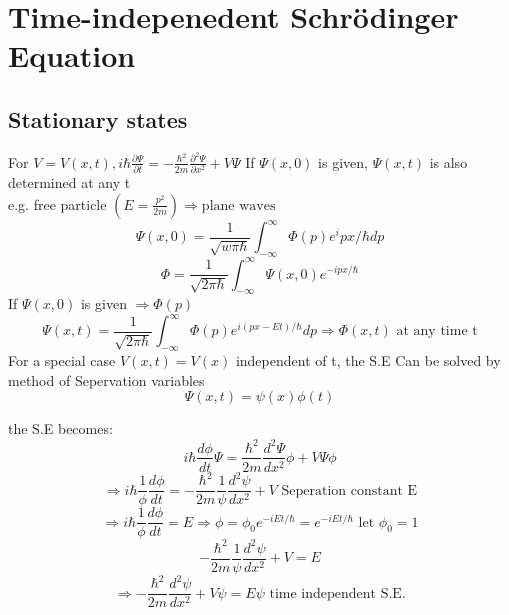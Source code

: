 \documentclass[12pt, a4paper]{article}
\begin{document}
\section{Time-indepenedent Schr\"odinger Equation}
\subsection{Stationary states}
For $V=V(x,t),i\hbar \frac{\partial \Psi}{\partial t}=-\frac{\hbar^2}{2m}\frac{\partial^2\Psi}{\partial x^2}+V\Psi$
If $\Psi(x,0)$ is given, $\Psi(x,t)$ is also determined at any t\\
e.g. free particle $(E=\frac{p^2}{2m})\Rightarrow\text{plane waves}$
$$\Psi(x,0)=\frac{1}{\sqrt{w\pi\hbar}}\int_{-\infty}^{\infty}\Phi(p)e^ipx/\hbar dp$$
$$\Phi=\frac{1}{\sqrt{2\pi \hbar}}\int_{-\infty}^{\infty}\Psi(x,0)e^{-ipx/\hbar}$$
If $\Psi(x,0)$ is given $\Rightarrow \Phi(p)$
$$\Psi(x,t)=\frac{1}{\sqrt{2\pi \hbar}}\int_{-\infty}^{\infty}\Phi(p)e^{i(px-Et)/\hbar}dp\Rightarrow \Phi(x,t) \text{ at any time t}$$ 
For a special case $V(x,t)=V(x)$ independent of t, the S.E Can be solved by method of Sepervation variables
$$\Psi(x,t)=\psi(x)\phi(t)$$

the S.E becomes:
$$i\hbar \frac{d\phi}{dt}\Psi = \frac{\hbar^2}{2m}\frac{d^2\Psi}{dx^2}\phi+V\Psi \phi$$
$$\Rightarrow i\hbar \frac{1}{\phi}\frac{d\phi}{dt}=-\frac{\hbar^2}{2m}\frac{1}{\psi}\frac{d^2\psi}{dx^2}+V\text{ Seperation constant E}$$
$$\Rightarrow i\hbar \frac{1}{\phi}\frac{d\phi}{dt}=E \Rightarrow\phi=\phi_0e^{-iEt/\hbar}=e^{-iEt/\hbar} \text{ let } \phi_0=1$$
$$-\frac{\hbar^2}{2m}\frac{1}{\psi}\frac{d^2\psi}{dx^2}+V=E$$
$$\Rightarrow -\frac{\hbar^2}{2m}\frac{d^2\psi}{dx^2}+V\psi=E\psi \text{ time independent S.E.}$$
\end{document}
